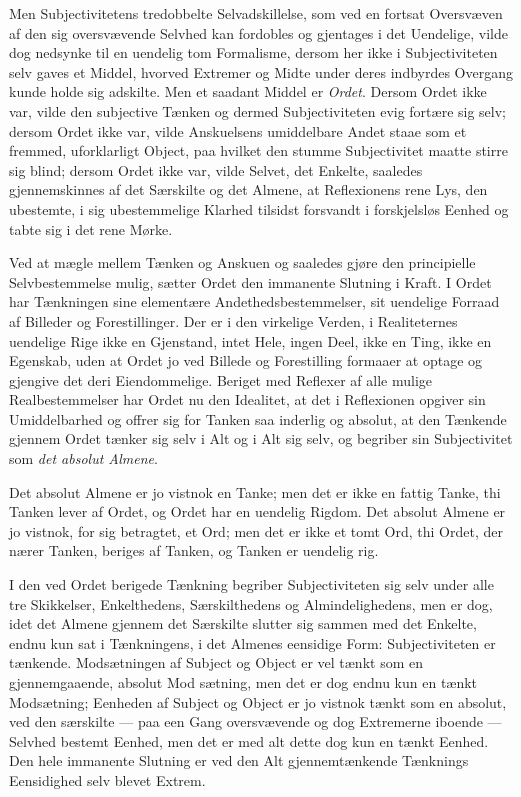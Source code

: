\documentclass[12pt]{book}
\newcommand{\opage}[1]{\marginnote{\footnotesize\textit{[#1]}}}
\begin{document}
Men Subjectivitetens tredobbelte Selvadskillelse, som ved en fortsat Oversvæven af den sig oversvævende Selvhed kan fordobles og gjentages i det Uendelige, vilde dog nedsynke til en uendelig tom Formalisme, dersom her ikke i Subjectiviteten selv gaves et Middel, hvorved Extremer og Midte under deres indbyrdes Overgang kunde holde sig adskilte. Men et saadant Middel er \emph{Ordet}. Dersom Ordet ikke var, vilde den subjective Tænken og dermed Subjectiviteten evig fortære
\opage{334}sig selv; dersom Ordet ikke var, vilde Anskuelsens umiddelbare Andet staae som et fremmed, uforklarligt Object, paa hvilket den stumme Subjectivitet maatte stirre sig blind; dersom Ordet ikke var, vilde Selvet, det Enkelte, saaledes gjennemskinnes af det Særskilte og det Almene, at Reflexionens rene Lys, den ubestemte, i sig ubestemmelige Klarhed tilsidst forsvandt i forskjelsløs Eenhed og tabte sig i det rene Mørke.

Ved at mægle mellem Tænken og Anskuen og saaledes gjøre den principielle Selvbestemmelse mulig, sætter Ordet den immanente Slutning i Kraft. I Ordet har Tænkningen sine elementære Andethedsbestemmelser, sit uendelige Forraad af Billeder og Forestillinger. Der er i den virkelige Verden, i Realiteternes uendelige Rige ikke en Gjenstand, intet Hele, ingen Deel, ikke en Ting, ikke en Egenskab, uden at Ordet jo ved Billede og Forestilling formaaer at optage og gjengive det deri Eiendommelige. Beriget med Reflexer af alle mulige Realbestemmelser har Ordet nu den Idealitet, at det i Reflexionen opgiver sin Umiddelbarhed og offrer sig for Tanken saa inderlig og absolut, at den Tænkende gjennem Ordet tænker sig selv i Alt og i Alt sig selv, og begriber sin Subjectivitet som \emph{det absolut Almene}.

Det absolut Almene er jo vistnok en Tanke; men det er ikke en fattig Tanke, thi Tanken lever af Ordet, og Ordet har en uendelig Rigdom. Det absolut Almene er jo vistnok, for sig betragtet, et Ord; men det er ikke et tomt Ord, thi Ordet, der nærer Tanken, beriges af Tanken, og Tanken er uendelig rig.

I den ved Ordet berigede Tænkning begriber Subjectiviteten sig selv under alle tre Skikkelser, Enkelthedens, Særskilthedens og Almindelighedens, men er dog, idet det Almene gjennem det Særskilte slutter sig sammen med det Enkelte, endnu kun sat i Tænkningens, i det Almenes eensidige Form: Subjectiviteten er tænkende. Modsætningen af Subject og Object er vel tænkt som en gjennemgaaende, absolut Mod%
\opage{335}sætning, men det er dog endnu kun en tænkt Modsætning; Eenheden af Subject og Object er jo vistnok tænkt som en absolut, ved den særskilte --- paa een Gang oversvævende og dog Extremerne iboende --- Selvhed bestemt Eenhed, men det er med alt dette dog kun en tænkt Eenhed. Den hele immanente Slutning er ved den Alt gjennemtænkende Tænknings Eensidighed selv blevet Extrem.
\end{document}
